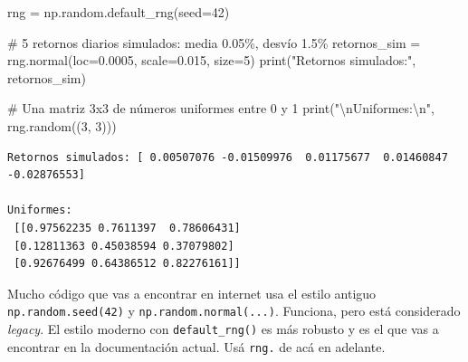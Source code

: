 \documentclass[
  spanish,
  letterpaper,
  DIV=11,
  numbers=noendperiod]{scrreprt}
\newenvironment{Shaded}{\begin{snugshade}}{\end{snugshade}}
\newcommand{\BuiltInTok}[1]{\textcolor[rgb]{0.00,0.23,0.31}{#1}}
\newcommand{\CharTok}[1]{\textcolor[rgb]{0.13,0.47,0.30}{#1}}
\newcommand{\CommentTok}[1]{\textcolor[rgb]{0.37,0.37,0.37}{#1}}
\newcommand{\DecValTok}[1]{\textcolor[rgb]{0.68,0.00,0.00}{#1}}
\newcommand{\FloatTok}[1]{\textcolor[rgb]{0.68,0.00,0.00}{#1}}
\newcommand{\NormalTok}[1]{\textcolor[rgb]{0.00,0.23,0.31}{#1}}
\newcommand{\OperatorTok}[1]{\textcolor[rgb]{0.37,0.37,0.37}{#1}}
\newcommand{\StringTok}[1]{\textcolor[rgb]{0.13,0.47,0.30}{#1}}
\begin{document}
\label{random}
\begin{Shaded}
\begin{Highlighting}[]
\NormalTok{rng }\OperatorTok{=}\NormalTok{ np.random.default\_rng(seed}\OperatorTok{=}\DecValTok{42}\NormalTok{)}

\CommentTok{\# 5 retornos diarios simulados: media 0.05\%, desvío 1.5\%}
\NormalTok{retornos\_sim }\OperatorTok{=}\NormalTok{ rng.normal(loc}\OperatorTok{=}\FloatTok{0.0005}\NormalTok{, scale}\OperatorTok{=}\FloatTok{0.015}\NormalTok{, size}\OperatorTok{=}\DecValTok{5}\NormalTok{)}
\BuiltInTok{print}\NormalTok{(}\StringTok{"Retornos simulados:"}\NormalTok{, retornos\_sim)}

\CommentTok{\# Una matriz 3x3 de números uniformes entre 0 y 1}
\BuiltInTok{print}\NormalTok{(}\StringTok{"}\CharTok{\textbackslash{}n}\StringTok{Uniformes:}\CharTok{\textbackslash{}n}\StringTok{"}\NormalTok{, rng.random((}\DecValTok{3}\NormalTok{, }\DecValTok{3}\NormalTok{)))}
\end{Highlighting}
\end{Shaded}

\begin{verbatim}
Retornos simulados: [ 0.00507076 -0.01509976  0.01175677  0.01460847 -0.02876553]

Uniformes:
 [[0.97562235 0.7611397  0.78606431]
 [0.12811363 0.45038594 0.37079802]
 [0.92676499 0.64386512 0.82276161]]
\end{verbatim}

\begin{tcolorbox}[enhanced jigsaw, bottomrule=.15mm, colback=white, opacitybacktitle=0.6, arc=.35mm, toprule=.15mm, opacityback=0, breakable, titlerule=0mm, left=2mm, coltitle=black, colbacktitle=quarto-callout-warning-color!10!white, colframe=quarto-callout-warning-color-frame, leftrule=.75mm, toptitle=1mm, bottomtitle=1mm, title=\textcolor{quarto-callout-warning-color}{\faExclamationTriangle}\hspace{0.5em}{Vas a ver \texttt{np.random.seed()} en código viejo}, rightrule=.15mm]

Mucho código que vas a encontrar en internet usa el estilo antiguo
\texttt{np.random.seed(42)} y \texttt{np.random.normal(...)}. Funciona,
pero está considerado \emph{legacy}. El estilo moderno con
\texttt{default\_rng()} es más robusto y es el que vas a encontrar en la
documentación actual. Usá \texttt{rng.} de acá en adelante.

\end{tcolorbox}
\end{document}
